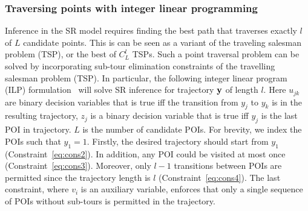 \subsubsection{Traversing points with integer linear programming}
Inference in the SR model requires finding the best path that traverses exactly $l$ of $L$ candidate points. 
This is can be seen as a variant of the traveling salesman problem (TSP), or the best of $C_L^l$ TSPs.
Such a point traversal problem can be solved by incorporating 
sub-tour elimination constraints of the travelling salesman problem (TSP).
In particular, the following integer linear program (ILP) formulation~\cite{ijcai15,cikm16paper} 
will solve SR inference for trajectory $\mathbf{y}$ of length $l$. 
Here $u_{jk}$ are binary decision variables that is true iff the transition from $y_j$ to $y_k$ is in the resulting trajectory,
$z_j$ is a binary decision variable that is true iff $y_j$ is the last POI in trajectory.
$L$ is the number of candidate POIs.
For brevity, we index the POIs such that $y_1 = 1$.
Firstly, the desired trajectory should start from $y_1$ (Constraint~\ref{eq:cons2}).
In addition, any POI could be visited at most once (Constraint~\ref{eq:cons3}).
Moreover, only $l-1$ transitions between POIs are permitted 
since the trajectory length is $l$ (Constraint~\ref{eq:cons4}).
The last constraint, where $v_i$ is an auxiliary variable,
enforces that only a single sequence of POIs without sub-tours is permitted in the trajectory.


